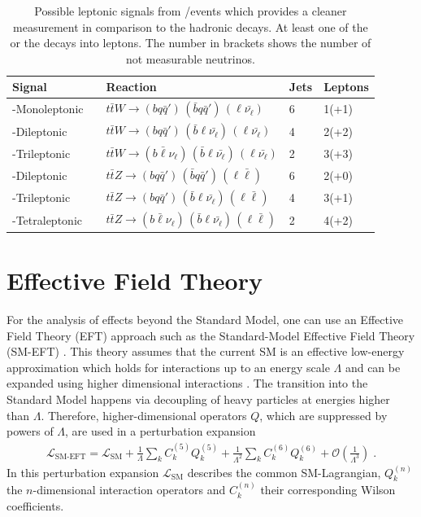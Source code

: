 \documentclass[bachelor,oneside, BCOR10mm,
			ngerman,english  %
]{GAUBM}
\begin{document}
\begin{table}[t]
	\renewcommand{\arraystretch}{1.5}
	\centering
	\caption{Possible leptonic signals from \ttbarZ/\ttbarW events which provides a cleaner measurement in comparison to the hadronic decays. At least one of the \tquarks or the \zwboson decays into leptons. The number in brackets shows the number of not measurable neutrinos.}
	\begin{tabular}{R{40mm}C{1mm}L{50mm}C{10mm}C{15mm}}
		Signal	&& Reaction & Jets & Leptons\\
		\hline
		\ttbarW-Monoleptonic 	&& $t\bar{t}W\rightarrow(bq\bar{q}')\,(\bar{b}q\bar{q}')\,(\ell\bar{\nu_\ell})$ 			& 6 & 1(+1)\\
		\ttbarW-Dileptonic 		&& $t\bar{t}W\rightarrow(bq\bar{q}')\,(\bar{b}\ell\bar{\nu_\ell})\,(\ell\bar{\nu_\ell})$ 	& 4 & 2(+2)\\
		\ttbarW-Trileptonic 	&& $t\bar{t}W\rightarrow(b\bar{\ell}\nu_\ell)\,(\bar{b}\ell\bar{\nu_\ell})\,(\ell\bar{\nu_\ell})$ & 2 & 3(+3)\\
		\ttbarZ-Dileptonic 		&& $t\bar{t}Z\rightarrow(bq\bar{q}')\,(\bar{b}q\bar{q}')\,(\ell\bar{\ell})$ 				& 6 & 2(+0)\\
		\ttbarZ-Trileptonic 	&& $t\bar{t}Z\rightarrow(bq\bar{q}')\,(\bar{b}\ell\bar{\nu_\ell})\,(\ell\bar{\ell})$ 		& 4 & 3(+1)\\
		\ttbarZ-Tetraleptonic 	&& $t\bar{t}Z\rightarrow(b\bar{\ell}\nu_\ell)\,(\bar{b}\ell\bar{\nu_\ell})\,(\ell\bar{\ell})$ 	& 2 & 4(+2)\\
	\end{tabular}
	\label{tab:decay_modes_ttz_ttW}
\end{table}

\section{Effective Field Theory}
\label{sec:TheoryEFT}
For the analysis of effects beyond the Standard Model, one can use an Effective Field Theory (EFT) approach such as the Standard-Model Effective Field Theory (SM-EFT) \cite{eft_operatorlist}. This theory assumes that the current SM is an effective low-energy approximation which holds for interactions up to an energy scale $\Lambda$ and can be expanded using higher dimensional interactions \cite{eft_introduction}. The transition into the Standard Model happens via decoupling of heavy particles at energies higher than $\Lambda$. Therefore, higher-dimensional operators $Q$, which are suppressed by powers of $\Lambda$, are used in a perturbation expansion \cite{eft_introduction}
\begin{align}
	\mathcal{L}_\text{SM-EFT} = \mathcal{L}_\text{SM} + \frac{1}{\Lambda}\sum_{k}C_k^{(5)}Q_k^{(5)} + \frac{1}{\Lambda^2}\sum_{k}C_k^{(6)}Q_k^{(6)} + \mathcal{O}\left(\frac{1}{\Lambda^3}\right)\;.\label{eq:SM-EFT}
\end{align}
In this perturbation expansion $\mathcal{L}_\text{SM}$ describes the common SM-Lagrangian, $Q_k^{(n)}$ the $n$-dimensional interaction operators and $C_k^{(n)}$ their corresponding Wilson coefficients. 
\end{document}
